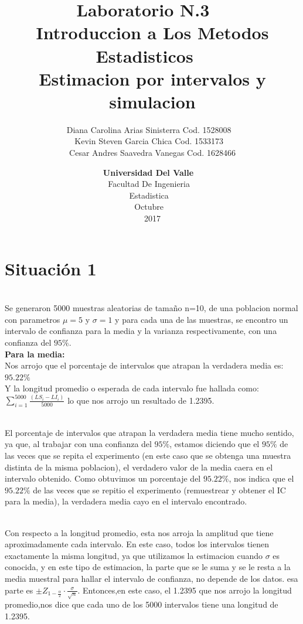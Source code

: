 \documentclass[letterpaper,12pt,onecolumn,titlepage]{article}
\title{
    \textbf{Laboratorio N.3}\
    ~\\{Introduccion a Los Metodos Estadisticos}   
    ~\\{Estimacion por intervalos y simulacion}}
\author{
    {Diana Carolina Arias Sinisterra Cod. 1528008}
 ~\\{Kevin Steven Garcia Chica Cod. 1533173}
 ~\\{Cesar Andres Saavedra Vanegas Cod. 1628466}}
\date{
     \textbf{Universidad Del Valle}\   
    ~\\{Facultad De Ingenieria}
    ~\\{Estadistica}
    ~\\{Octubre}
    ~\\{2017}}
\begin{document}
 
\renewcommand{\listtablename}{}
\renewcommand{\tablename}{Tabla}
\maketitle
\setcounter{page}{2}
\tableofcontents{}

\thispagestyle{empty}

\newpage
\fancyhead{}
\fancyfoot{}
 
\lfoot{Universidad Del Valle}
\rfoot{\thepage}


 
\pagebreak\section{Situaci\'{o}n 1}
~\\ Se generaron 5000 muestras aleatorias de tama\~{n}o n=10, de una poblacion normal con parametros $\mu=5$ y $\sigma=1$ y para cada una de las muestras, se encontro un intervalo de confianza para la media y la varianza respectivamente, con una confianza del $95\%$.
~\\ \textbf{Para la media:}
~\\Nos arrojo que el porcentaje de intervalos que atrapan la verdadera media es: $95.22\%$
~\\ Y la longitud promedio o esperada de cada intervalo fue hallada como: $\sum\limits_{i=1}^{5000}\frac{(LS_{i}-LI_{i})}{5000}$ lo que nos arrojo un resultado de 1.2395.

~\\El porcentaje de intervalos que atrapan la verdadera media tiene mucho sentido, ya que, al trabajar con una confianza del $95\%$, estamos diciendo que el $95\%$ de las veces que se repita el experimento (en este caso que se obtenga una muestra distinta de la misma poblacion), el verdadero valor de la media caera en el intervalo obtenido. Como obtuvimos un porcentaje del $95.22\%$, nos indica que el $95.22\%$ de las veces que se repitio el experimento (remuestrear y obtener el IC para la media), la verdadera media cayo en el intervalo encontrado.

~\\ Con respecto a la longitud promedio, esta nos arroja la amplitud que tiene aproximadamente cada intervalo. En este caso, todos los intervalos tienen exactamente la misma longitud, ya que utilizamos la estimacion cuando $\sigma$ es conocida, y en este tipo de estimacion, la parte que se le suma y se le resta a la media muestral para hallar el intervalo de confianza, no depende de los datos. esa parte es $\pm Z_{1-\frac{\alpha}{2}}\cdot\frac{\sigma}{\sqrt{n}}$. Entonces,en este caso, el 1.2395 que nos arrojo la longitud promedio,nos dice que cada uno de los 5000 intervalos tiene una longitud de 1.2395.
\end{document}
